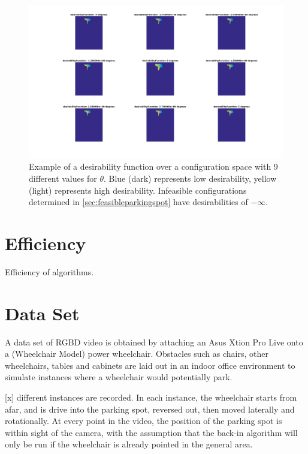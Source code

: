 \begin{figure}
\centering
\includegraphics[width=6in]{figures/desirabilityfunction.png}
\caption{Example of a desirability function over a configuration space with 9
different values for $\theta$. Blue (dark) represents low desirability, yellow
(light) represents high desirability. Infeasible configurations determined in 
\autoref{sec:feasibleparkingspot} have desirabilities of $-\infty$.} 
\label{fig:desirabilityfunction}
\end{figure}

\section{Efficiency}
Efficiency of algorithms.

\section{Data Set}
\label{sec:rgbddataset}
A data set of RGBD video is obtained by attaching an Asus Xtion Pro Live onto a
(Wheelchair Model) power wheelchair. Obstacles such as chairs, other
wheelchairs, tables and cabinets are laid out in an indoor office environment to
simulate instances where a wheelchair would potentially park.

[x] different instances are recorded. In each instance, the wheelchair starts
from afar, and is drive into the parking spot, reversed out, then moved
laterally and rotationally. At every point in the video, the position of the
parking spot is within sight of the camera, with the assumption that the back-in
algorithm will only be run if the wheelchair is already pointed in the general
area.


